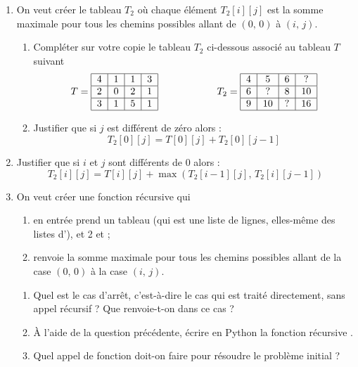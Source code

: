 \documentclass[a4paper,12pt,french]{article}
\begin{document}
\begin{enumerate}[\bfseries 1.]
    \item On veut créer le tableau $T_2$ où chaque élément $T_2[i][j]$ est la somme maximale pour tous les chemins possibles allant de $(0,\,0)$ à $(i,\,j)$.
    \begin{enumerate}[\bfseries a.]
    	\item 	Compléter sur votre copie le tableau $T_2$ ci-dessous associé au tableau $T$ suivant
                $$T=
                \begin{tabular}{|c|c|c|c|}
                \hline
                4&1&1&3\\
                \hline
                2&0&2&1\\
                \hline
                3&1&5&1\\
                \hline
                \end{tabular}\qquad\qquad\qquad T_2=
                                \begin{tabular}{|c|c|c|c|}
                                \hline
                                4&5&6&?\\
                                \hline
                                6&?&8&10\\
                                \hline
                                9&10&?&16\\
                                \hline
                                \end{tabular}$$
    	   \item Justifier que si $j$ est différent de zéro alors :
           $$T_2[0][j] = T[0][j] + T_2[0][j - 1]$$
    \end{enumerate}
    \item Justifier que si $i$ et $j$ sont différents de 0 alors :\\
            $$T_2[i][j] = T[i][j]+\max(T_2[i-1][j],\, T_2[i][j-1])$$

     \item On veut créer une fonction récursive  qui
     \begin{enumerate}[--]
     	\item 	en entrée prend un tableau  (qui est une liste de lignes, elles-même des listes d'), et 2  et ;
     	\item 	renvoie la somme maximale pour tous les chemins possibles allant de la case $(0,\,0)$ à la case $(i,\,j)$.
      \end{enumerate}
      \begin{enumerate}[\bfseries a.]
        \item Quel est le cas d'arrêt, c'est-à-dire le cas qui est traité directement, sans appel récursif ? Que renvoie-t-on dans ce cas ?
        \item À l'aide de la question précédente, écrire en Python la fonction récursive .
        \item Quel appel de fonction doit-on faire pour résoudre le problème initial ?
     \end{enumerate}
\end{enumerate}
\end{document}
